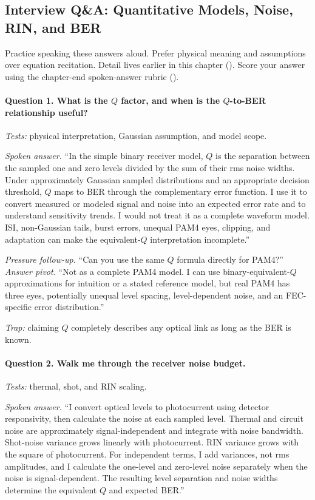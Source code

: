 \subsection{Interview Q\&A: Quantitative Models, Noise, RIN, and BER}
\label{sec:models-interview-qa}

Practice speaking these answers aloud. Prefer physical meaning and assumptions
over equation recitation. Detail lives earlier in this chapter
().
Score your answer using the chapter-end spoken-answer rubric
().

\paragraph{Question 1. What is the $Q$ factor, and when is the $Q$-to-BER
relationship useful?}
\textit{Tests:} physical interpretation, Gaussian assumption, and model scope.

\textit{Spoken answer.}
``In the simple binary receiver model, $Q$ is the separation between the sampled
one and zero levels divided by the sum of their rms noise widths. Under
approximately Gaussian sampled distributions and an appropriate decision
threshold, $Q$ maps to BER through the complementary error function. I use it to
convert measured or modeled signal and noise into an expected error rate and to
understand sensitivity trends. I would not treat it as a complete waveform
model. ISI, non-Gaussian tails, burst errors, unequal PAM4 eyes, clipping, and
adaptation can make the equivalent-$Q$ interpretation incomplete.''

\textit{Pressure follow-up.} ``Can you use the same $Q$ formula directly for
PAM4?''\\
\textit{Answer pivot.} ``Not as a complete PAM4 model. I can use
binary-equivalent-$Q$ approximations for intuition or a stated reference model,
but real PAM4 has three eyes, potentially unequal level spacing, level-dependent
noise, and an FEC-specific error distribution.''

\textit{Trap:} claiming $Q$ completely describes any optical link as long as the
BER is known.

\paragraph{Question 2. Walk me through the receiver noise budget.}
\textit{Tests:} thermal, shot, and RIN scaling.

\textit{Spoken answer.}
``I convert optical levels to photocurrent using detector responsivity, then
calculate the noise at each sampled level. Thermal and circuit noise are
approximately signal-independent and integrate with noise bandwidth. Shot-noise
variance grows linearly with photocurrent. RIN variance grows with the square of
photocurrent. For independent terms, I add variances, not rms amplitudes, and I
calculate the one-level and zero-level noise separately when the noise is
signal-dependent. The resulting level separation and noise widths determine the
equivalent $Q$ and expected BER.''

